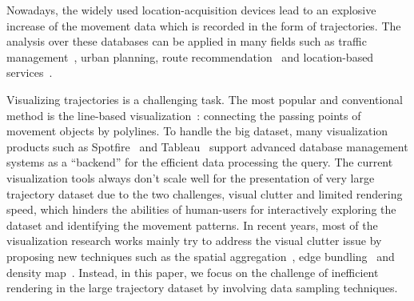Nowadays, the widely used location-acquisition devices lead to an explosive increase of the movement data which is recorded in the form of trajectories. 
The analysis over these databases can be applied in many fields such as traffic management~\cite{wang2014visual}, urban planning, route recommendation~\cite{zheng2011learning} and location-based services~\cite{liu2016smartadp, zheng2010collaborative}. 

Visualizing trajectories is a challenging task. The most popular and conventional method is the line-based visualization~\cite{chen2015survey}: connecting the passing points of movement objects by polylines. To handle the big dataset, many visualization products such as Spotfire~\cite{} and Tableau~\cite{} support advanced database management systems as a ``backend'' for the efficient data processing the query. The current visualization tools always don't scale well for the presentation of very large trajectory dataset due to the two challenges, visual clutter and limited rendering speed, which hinders the abilities of human-users for interactively exploring the dataset and identifying the movement patterns. 
In recent years, most of the visualization research works mainly try to address the visual clutter issue by proposing new techniques such as the spatial aggregation~\cite{zeng2013visualizing, von2015mobilitygraphs}, edge bundling~\cite{zeng2019route, thony2015vector} and density map~\cite{lampe2011interactive, scheepens2011interactive}. Instead, in this paper, we focus on the challenge of inefficient rendering in the large trajectory dataset by involving data sampling techniques. 


